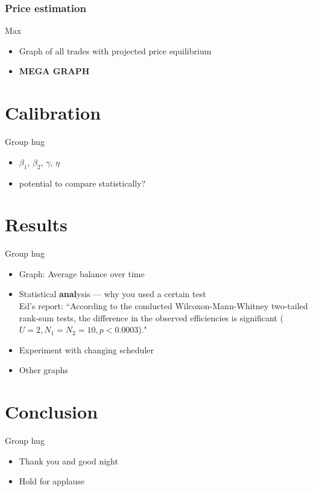\documentclass[12pt]{article} %
\begin{document}
\subsubsection{Price estimation}
Max
\begin{itemize} \itemsep0pt
	\item Graph of all trades with projected price equilibrium
	\item \textbf{MEGA GRAPH}
\end{itemize}


\section{Calibration}
Group hug
\begin{itemize} \itemsep0pt
	\item $\beta_1$, $\beta_2$, $\gamma$, $\eta$
	\item potential to compare statistically?
\end{itemize}


\section{Results}
Group hug
\begin{itemize} \itemsep0pt
	\item Graph: Average balance over time
	\item Statistical \textbf{anal}ysis --- why you used a certain test\\
Ed's report: ``According to the conducted Wilcoxon-Mann-Whitney two-tailed rank-sum tests, the difference in the observed efficiencies is significant ($U = 2, N_1 = N_2 = 10, p < 0.0003$)."
	\item Experiment with changing scheduler
	\item Other graphs
\end{itemize}

\section{Conclusion}
Group hug
\begin{itemize} \itemsep0pt
	\item Thank you and good night
	\item Hold for applause
\end{itemize}


%
%
\end{document}
